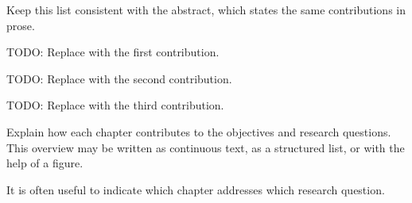  Keep this list consistent with the abstract, which states the same contributions in prose.

\begin{ThesisContribution}
  \item\label{c:example-one} TODO: Replace with the first contribution.
  \item\label{c:example-two} TODO: Replace with the second contribution.
  \item\label{c:example-three} TODO: Replace with the third contribution.
\end{ThesisContribution}



Explain how each chapter contributes to the objectives and research questions.
This overview may be written as continuous text, as a structured list, or with the help of a figure.

It is often useful to indicate which chapter addresses which research question.

